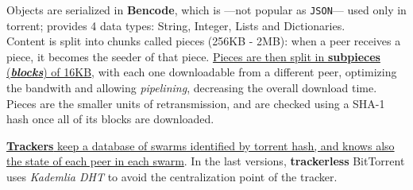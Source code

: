 Objects are serialized in \textbf{Bencode}, which is ---not popular as \texttt{JSON}--- used only in torrent; provides 4 data types: String, Integer, Lists and Dictionaries.\\
Content is split into chunks called pieces (256KB - 2MB):
when a peer receives a piece, it becomes the seeder of that piece.
\ul{Pieces are then split in \textbf{subpieces} (\textit{\textbf{blocks}}) of 16KB}, with each one downloadable from a different peer, optimizing the bandwith and allowing \textit{pipelining}, decreasing the overall download time.
Pieces are the smaller units of retransmission, and are checked using a SHA-1 hash once all of its blocks are downloaded.

\ul{\textbf{Trackers} keep a database of swarms identified by torrent hash, and knows also the state of each peer in each swarm}.
In the last versions, \textbf{trackerless} BitTorrent uses \textit{Kademlia DHT} to avoid the centralization point of the tracker.

